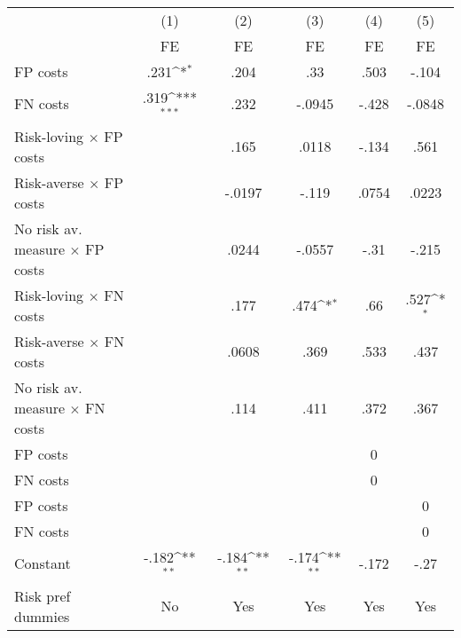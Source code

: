 {
\def\sym#1{\ifmmode^{#1}\else\(^{#1}\)\fi}
\begin{tabular}{l*{5}{c}}
\hline\hline
                &\multicolumn{1}{c}{(1)}&\multicolumn{1}{c}{(2)}&\multicolumn{1}{c}{(3)}&\multicolumn{1}{c}{(4)}&\multicolumn{1}{c}{(5)}\\
                &\multicolumn{1}{c}{FE}&\multicolumn{1}{c}{FE}&\multicolumn{1}{c}{FE}&\multicolumn{1}{c}{FE}&\multicolumn{1}{c}{FE}\\
\hline
FP costs        &     .231\sym{*}  &     .204         &      .33         &     .503         &    -.104         \\
FN costs        &     .319\sym{***}&     .232         &   -.0945         &    -.428         &   -.0848         \\
Risk-loving $\times$ FP costs&                  &     .165         &    .0118         &    -.134         &     .561         \\
Risk-averse $\times$ FP costs&                  &   -.0197         &    -.119         &    .0754         &    .0223         \\
No risk av. measure $\times$ FP costs&                  &    .0244         &   -.0557         &     -.31         &    -.215         \\
Risk-loving $\times$ FN costs&                  &     .177         &     .474\sym{*}  &      .66         &     .527\sym{*}  \\
Risk-averse $\times$ FN costs&                  &    .0608         &     .369         &     .533         &     .437         \\
No risk av. measure $\times$ FN costs&                  &     .114         &     .411         &     .372         &     .367         \\
FP costs        &                  &                  &                  &        0         &                  \\
FN costs        &                  &                  &                  &        0         &                  \\
FP costs        &                  &                  &                  &                  &        0         \\
FN costs        &                  &                  &                  &                  &        0         \\
Constant        &    -.182\sym{**} &    -.184\sym{**} &    -.174\sym{**} &    -.172         &     -.27         \\
Risk pref dummies &       No         &      Yes         &      Yes         &      Yes         &      Yes         \\

\end{tabular}}
